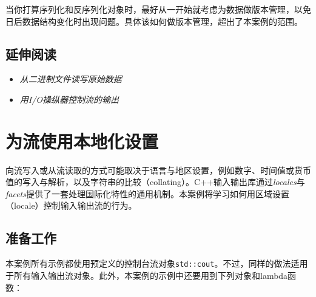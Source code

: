 
\begin{myNote}
当你打算序列化和反序列化对象时，最好从一开始就考虑为数据做版本管理，以免日后数据结构变化时出现问题。具体该如何做版本管理，超出了本案例的范围。
\end{myNote}



\subsection{延伸阅读}



\begin{itemize}
\item \textit{从二进制文件读写原始数据}



\item \textit{用I/O操纵器控制流的输出}

\end{itemize}



\section{为流使用本地化设置}



向流写入或从流读取的方式可能取决于语言与地区设置，例如数字、时间值或货币值的写入与解析，以及字符串的比较（collating）。C++输入输出库通过\textit{locales}与\textit{facets}提供了一套处理国际化特性的通用机制。本案例将学习如何用区域设置（locale）控制输入输出流的行为。



\subsection{准备工作}



本案例所有示例都使用预定义的控制台流对象\texttt{std::\allowbreak{}cout}。不过，同样的做法适用于所有输入输出流对象。此外，本案例的示例中还要用到下列对象和lambda函数：



